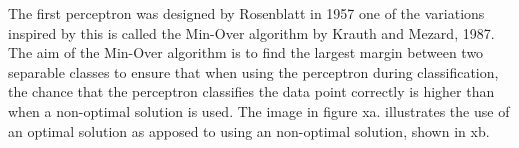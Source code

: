 The first perceptron was designed by Rosenblatt in 1957 one of the variations inspired by this is called the Min-Over algorithm by Krauth and Mezard, 1987.   The aim of the Min-Over algorithm is to find the largest margin between two separable classes to ensure that when using the perceptron during classification, the chance that the perceptron classifies the data point correctly is higher than when a non-optimal solution is used. The image in figure xa. illustrates the use of an optimal solution as apposed to using an non-optimal solution, shown in xb.


